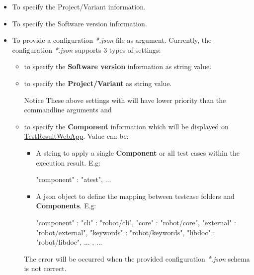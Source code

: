 \begin{itemize}
\item {}

  To specify the {Project/Variant} information.

\item {}

  To specify the {Software version} information.

\item {}

  To provide a configuration \emph{*.json} file as  argument.
  Currently, the configuration \emph{*.json} supports 3 types of settings:

  \begin{itemize}
  \item {} to specify the \textbf{Software version} information as string 
        value.
  \item {} to specify the \textbf{Project/Variant} as string value.
  \begin{boxhint} {Notice}
    These above settings with  will have lower priority than the 
    commandline arguments  and 
  \end{boxhint}

  \item {} to specify the \textbf{Component} information which will be 
        displayed on \href{https://github.com/test-fullautomation/testresultwebapp}
        {TestResultWebApp}. Value can be:
        \begin{itemize}
          \item A string to apply a single \textbf{Component} or all test cases 
                within the execution result. E.g:
\begin{robotcode}
{
  "component" : "atest",
  ...
}
\end{robotcode}
          \item A json object to define the mapping between testcase folders and 
                \textbf{Components}. E.g:
\begin{robotcode}
  {
    "component" : {
      "cli"       : "robot/cli",
      "core"      : "robot/core",
      "external"  : "robot/external",
      "keywords"  : "robot/keywords",
      "libdoc"    : "robot/libdoc",
      ...
    },
    ...
  }
\end{robotcode}
        \end{itemize}
        The error will be occurred when the provided configuration
        \emph{*.json} schema is not correct.
  \end{itemize}
        


\end{itemize}

